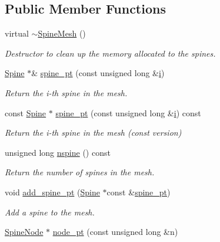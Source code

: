 \subsection*{Public Member Functions}
\begin{DoxyCompactItemize}
\item 
virtual \hyperlink{classoomph_1_1SpineMesh_ad60286797fb2e8fc4d72efd2719b5623}{$\sim$\+Spine\+Mesh} ()
\begin{DoxyCompactList}\small\item\em Destructor to clean up the memory allocated to the spines. \end{DoxyCompactList}\item 
\hyperlink{classoomph_1_1Spine}{Spine} $\ast$\& \hyperlink{classoomph_1_1SpineMesh_aa8a4afbc37ff7f4c19e44c28c1d7552a}{spine\+\_\+pt} (const unsigned long \&\hyperlink{cfortran_8h_adb50e893b86b3e55e751a42eab3cba82}{i})
\begin{DoxyCompactList}\small\item\em Return the i-\/th spine in the mesh. \end{DoxyCompactList}\item 
const \hyperlink{classoomph_1_1Spine}{Spine} $\ast$ \hyperlink{classoomph_1_1SpineMesh_a13ad12ffbc4d5880aebdfbabc01755e1}{spine\+\_\+pt} (const unsigned long \&\hyperlink{cfortran_8h_adb50e893b86b3e55e751a42eab3cba82}{i}) const
\begin{DoxyCompactList}\small\item\em Return the i-\/th spine in the mesh (const version) \end{DoxyCompactList}\item 
unsigned long \hyperlink{classoomph_1_1SpineMesh_a8aa10bf71f0d0126e2cdb98a4a4ae264}{nspine} () const
\begin{DoxyCompactList}\small\item\em Return the number of spines in the mesh. \end{DoxyCompactList}\item 
void \hyperlink{classoomph_1_1SpineMesh_a4bd8248041f7ed8337d65ce763afa8ee}{add\+\_\+spine\+\_\+pt} (\hyperlink{classoomph_1_1Spine}{Spine} $\ast$const \&\hyperlink{classoomph_1_1SpineMesh_aa8a4afbc37ff7f4c19e44c28c1d7552a}{spine\+\_\+pt})
\begin{DoxyCompactList}\small\item\em Add a spine to the mesh. \end{DoxyCompactList}\item 
\hyperlink{classoomph_1_1SpineNode}{Spine\+Node} $\ast$ \hyperlink{classoomph_1_1SpineMesh_a55bfdb79c8cf307c1b36e4948e5dc298}{node\+\_\+pt} (const unsigned long \&n)

\end{DoxyCompactItemize}
